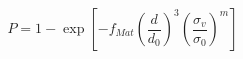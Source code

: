 \documentclass[12pt]{article}
\begin{document}
$$
P = 1 -\exp\left[-f_{Mat}\left(\frac{d}{d_{0}}\right)^{3}\left(\frac{\sigma_v}{\sigma_0}\right)^{m}\right]
$$
\end{document}
